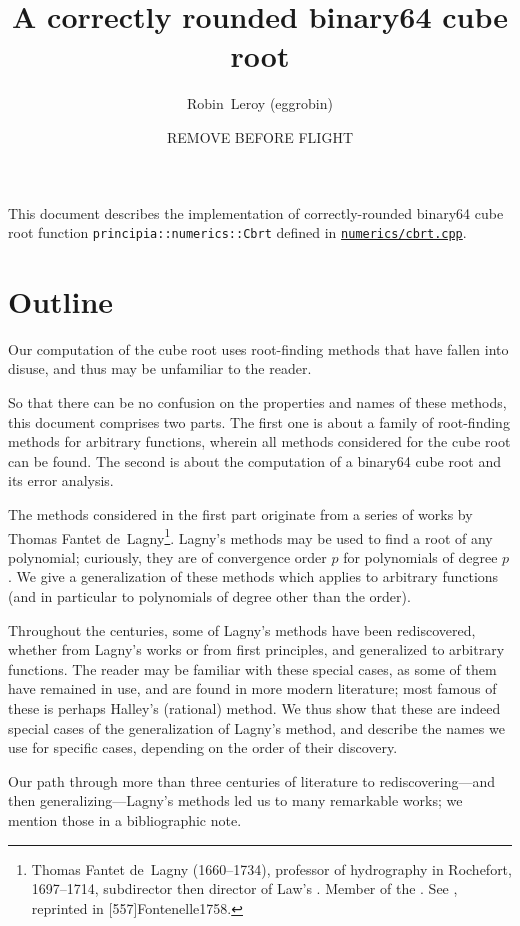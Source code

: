 ﻿\documentclass[10pt, a4paper, twoside]{basestyle}
\title{A correctly rounded binary64 cube root}
\date{REMOVE BEFORE FLIGHT \printdate{2021-04-36}}
\author{Robin~Leroy (eggrobin)}
\begin{document}
\maketitle
\noindent
This document describes the implementation of correctly-rounded binary64 cube root function {\texttt{principia::numerics::Cbrt}}
defined in \href{https://github.com/mockingbirdnest/Principia/blob/master/numerics/cbrt.cpp}{\texttt{numerics/cbrt.cpp}}.

\part*{Outline}

Our computation of the cube root uses root-finding methods that have fallen into disuse, and thus may be unfamiliar to the reader.

So that there can be no confusion on the properties and names of these methods, this document comprises two parts.
The first one is about a family of root-finding methods for arbitrary functions, wherein all methods
considered for the cube root can be found. The second is about the computation of a binary64 cube root and its error
analysis.

The methods considered in the first part originate from a series of works by Thomas Fantet de~Lagny\footnote{Thomas Fantet de~Lagny (1660--1734), professor
of hydrography in Rochefort, 1697--1714, subdirector then director of Law's .
Member of the . See \cite{Fontenelle1734}, reprinted in [557\psqq]{Fontenelle1758}.}. Lagny's methods
may be used to find a root of any polynomial; curiously, they are of convergence order $p$ for polynomials of degree $p$.
We give a generalization of these methods which applies to arbitrary functions (and in particular to polynomials
of degree other than the order).

Throughout the centuries, some of Lagny's methods have been rediscovered, whether from Lagny's works or from first principles,
and generalized to arbitrary functions. The reader may be familiar with these special cases, as some of them have remained in
use, and are found in more modern literature; most famous of these is perhaps Halley's (rational) method. We thus show that
these are indeed special cases of the generalization of Lagny's method, and describe the names we use for specific cases,
depending on the order of their discovery.

Our path through more than three centuries of literature to rediscovering---and then generalizing---Lagny's methods led us to
many remarkable works; we mention those in a bibliographic note.
\end{document}
